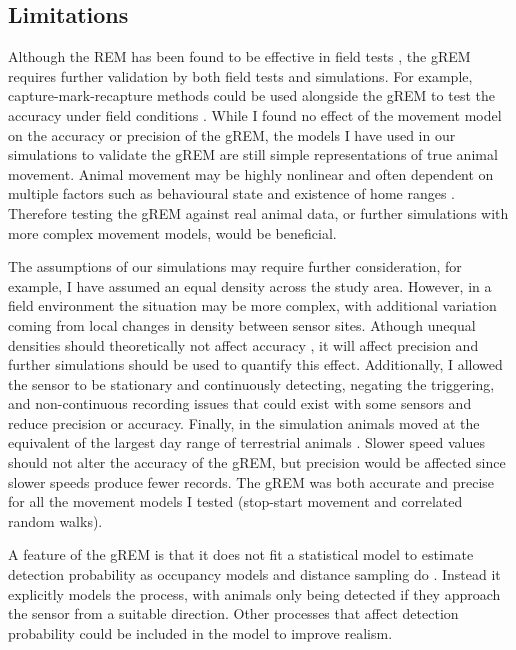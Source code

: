 \subsection{Limitations}

Although the REM has been found to be effective in field tests \cite{rowcliffe2008estimating, zero2013monitoring}, the gREM requires further validation by both field tests and simulations.
For example, capture-mark-recapture methods could be used alongside the gREM to test the accuracy under field conditions \cite{rowcliffe2008estimating}.
While I found no effect of the movement model on the accuracy or precision of the gREM, the models I have used in our simulations to validate the gREM are still simple representations of true animal movement.
Animal movement may be highly nonlinear and often dependent on multiple factors such as behavioural state and existence of home ranges \cite{smouse2010stochastic}.
Therefore testing the gREM against real animal data, or further simulations with more complex movement models, would be beneficial.

The assumptions of our simulations may require further consideration, for example, I have assumed an equal density across the study area.
However, in a field environment the situation may be more complex, with additional variation coming from local changes in density between sensor sites.
Athough unequal densities should theoretically not affect accuracy \cite{Hutchinson_Waser_2007}, it will affect precision and further simulations should be used to quantify this effect.
Additionally, I allowed the sensor to be stationary and continuously detecting, negating the triggering, and non-continuous recording issues that could exist with some sensors and reduce precision or accuracy.
Finally, in the simulation animals moved at the equivalent of the largest day range of terrestrial animals \cite{carbone2005far}.
Slower speed values should not alter the accuracy of the gREM, but precision would be affected since slower speeds produce fewer records.
The gREM was both accurate and precise for all the movement models I tested (stop-start movement and correlated random walks).

A feature of the gREM is that it does not fit a statistical model to estimate detection probability as occupancy models and distance sampling do \cite{royle2003estimating, barlow2005estimates, marques2011estimating}.
Instead it explicitly models the process, with animals only being detected if they approach the sensor from a suitable direction.
Other processes that affect detection probability could be included in the model to improve realism.

